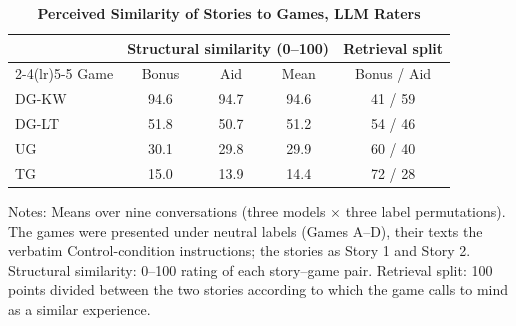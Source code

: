\begin{table}[!htbp]
\centering
\footnotesize
\renewcommand{\arraystretch}{1.15}
\caption{\textbf{Perceived Similarity of Stories to Games, LLM Raters}}
\label{tab:llm_similarity}
\begin{tabular}{l ccc c}
\toprule
& \multicolumn{3}{c}{Structural similarity (0--100)} & Retrieval split \\
\cmidrule(lr){2-4}\cmidrule(lr){5-5}
Game & Bonus & Aid & Mean & Bonus / Aid \\
\midrule
DG-KW & 94.6 & 94.7 & 94.6 & 41 / 59 \\
DG-LT & 51.8 & 50.7 & 51.2 & 54 / 46 \\
UG    & 30.1 & 29.8 & 29.9 & 60 / 40 \\
TG    & 15.0 & 13.9 & 14.4 & 72 / 28 \\
\bottomrule
\end{tabular}
\begin{flushleft}
\footnotesize Notes: Means over nine conversations (three models $\times$ three label permutations). The games were presented under neutral labels (Games A--D), their texts the verbatim Control-condition instructions; the stories as Story 1 and Story 2. Structural similarity: 0--100 rating of each story--game pair. Retrieval split: 100 points divided between the two stories according to which the game calls to mind as a similar experience.
\end{flushleft}
\end{table}
